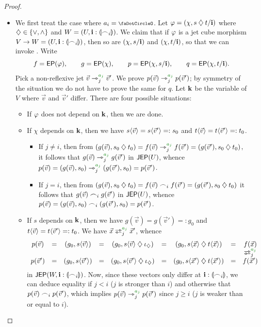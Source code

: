\documentclass[a4paper]{memoir}
\begin{document}
\begin{proof}
\begin{itemize}
		\begin{itemize}
			\item We first treat the case where $a_i = \npolar$.
			Let $\varphi = (\chi, s \mathbin{\diamondsuit} t/\mathbf{i})$ where $\mathbin{\diamondsuit} \in \mathopen{}\left\{ {\vee}, {\wedge} \right\}\mathclose{}$ and $W = (U, \mathbf{i} : {\llparenthesis \frown_i \rrparenthesis})$.
			We claim that if $\varphi$ is a jet cube morphism $V \to W = (U, \mathbf{i} : {\llparenthesis \frown_i \rrparenthesis})$, then so are $(\chi, s/\mathbf{i})$ and $(\chi, t/\mathbf{i})$, so that we can invoke .
			Write
			\[
				f = \mathsf{EP}(\varphi), \qquad
				g = \mathsf{EP}(\chi), \qquad
				p = \mathsf{EP}(\chi, s/\mathbf{i}), \qquad
				q = \mathsf{EP}(\chi, t/\mathbf{i}).
			\]
			Pick a non-reflexive jet $\vec v \jet_j\pmr{a_j} \vec v'$.
			We prove $p(\vec v) \jet_j\pmr{a_j} p(\vec v')$; by symmetry of the situation we do not have to prove the same for $q$.
			Let $\mathbf{k}$ be the variable of $V$ where $\vec v$ and $\vec v'$ differ.
			There are four possible situations:
			\begin{itemize}
				\item If $\varphi$ does not depend on $\mathbf{k}$, then we are done.
				\item If $\chi$ depends on $\mathbf{k}$, then we have $s \langle \vec v \rangle = s \langle \vec v' \rangle =: s_0$ and $t \langle \vec v \rangle = t \langle \vec v' \rangle =: t_0$.
				\begin{itemize}
					\item If $j \neq i$, then from $(g(\vec v), s_0 \opA t_0) = f(\vec v) \jet_j\pmr{a_j} f(\vec v') = (g(\vec v'), s_0 \opA t_0)$, it follows that $g(\vec v) \jet_j\pmr{a_j} g(\vec v')$ in $\mathsf{JEP}(U)$, whence $p(\vec v) = (g(\vec v), s_0) \jet_j\pmr{a_j} (g(\vec v'), s_0) = p(\vec v')$.
					\item If $j = i$, then from $(g(\vec v), s_0 \mathbin{\diamondsuit} t_0) = f(\vec v) \frown_i f(\vec v') = (g(\vec v'), s_0 \mathbin{\diamondsuit} t_0)$ it follows that $g(\vec v) \frown_i g(\vec v')$ in $\mathsf{JEP}(U)$, whence $p(\vec v) = (g(\vec v), s_0) \frown_i (g(\vec v'), s_0) = p(\vec v')$.
				\end{itemize}
				\item If $s$ depends on $\mathbf{k}$, then we have $g(\vec v) = g(\vec v') =: g_0$ and $t \langle \vec v \rangle = t \langle \vec v' \rangle =: t_0$.
				\introtauxx{}
				We have $\vec x \infrajet_j\pmr{a_j} \vec x'$, whence
				\[
					\begin{array}{c c c c c c c c c}
					p(\vec v)
					&=& (g_0, s \psub{\vec v})
					&=& (g_0, s \psub{\vec v} \opA \neutralA)
					&=& (g_0, s \psub{\vec x} \opA t \psub{\vec x})
					&=& f(\vec x)
					\\
					&&&&&&&& \infrajet_j\pmr{a_j}
					\\
					p(\vec v')
					&=& (g_0, s \psub{\vec v'})
					&=& (g_0, s \psub{\vec v'} \opA \neutralA)
					&=& (g_0, s \psub{\vec x'} \opA t \psub{\vec x'})
					&=& f(\vec x')
					\end{array}
				\]
				in $\mathsf{JEP}(W, \mathbf{i} : {\llparenthesis \frown_i \rrparenthesis})$.
				Now, since these vectors only differ at $\mathbf{i} : {\llparenthesis \frown_i \rrparenthesis}$, we can deduce equality if $j < i$ ($j$ is stronger than $i$) and otherwise that $p(\vec v) \frown_i p(\vec v')$, which implies $p(\vec v) \jet_j\pmr{a_j} p(\vec v')$ since $j \geq i$ ($j$ is weaker than or equal to $i$).
				

\end{itemize}
\end{itemize}
\end{itemize}
\end{proof}
\end{document}
